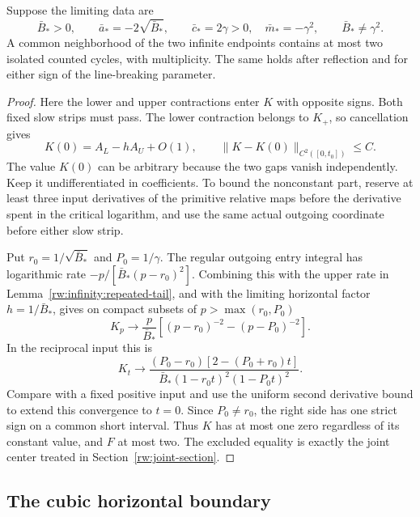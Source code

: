 \begin{proposition}\label{rw:infinity:opposing}
Suppose the limiting data are
\[
 \bar B_*>0,\qquad \bar a_*=-2\sqrt{\bar B_*},\qquad
 \bar c_*=2\gamma>0,\quad\bar m_*=-\gamma^2,\qquad
 \bar B_*\ne\gamma^2.
\]
A common neighborhood of the two infinite endpoints contains at most
two isolated counted cycles, with multiplicity. The same holds after
reflection and for either sign of the line-breaking parameter.
\end{proposition}
\begin{proof}
Here the lower and upper contractions enter $K$ with opposite signs.
Both fixed slow strips must pass. The lower contraction belongs to
$K_+$, so cancellation gives
\[
 K(0)=A_L-hA_U+O(1),\qquad
 \|K-K(0)\|_{C^2([0,t_0])}\le C.
\]
The value $K(0)$ can be arbitrary because the two gaps vanish
independently. Keep it undifferentiated in coefficients. To
bound the nonconstant part, reserve at least three input derivatives
of the primitive relative maps before the derivative spent in the
critical logarithm, and use the same actual outgoing coordinate
before either slow strip.

Put $r_0=1/\sqrt{\bar B_*}$ and $P_0=1/\gamma$.
The regular outgoing entry integral has logarithmic rate
$-p/[\bar B_*(p-r_0)^2]$. Combining this with the upper rate in
Lemma~\ref{rw:infinity:repeated-tail}, and with the limiting horizontal
factor $h=1/\bar B_*$, gives on compact subsets of
$p>\max(r_0,P_0)$
\[
 K_p\longrightarrow\frac p{\bar B_*}
      [(p-r_0)^{-2}-(p-P_0)^{-2}].
\]
In the reciprocal input this is
\begin{equation}\label{rw:infinity:opposing-slope}
 K_t\longrightarrow
 \frac{(P_0-r_0)[2-(P_0+r_0)t]}
 {\bar B_*(1-r_0t)^2(1-P_0t)^2}.
\end{equation}
Compare with a fixed positive input and use the uniform second
derivative bound to extend this convergence to $t=0$. Since
$P_0\ne r_0$, the right side has one strict sign on a common short interval. Thus $K$
has at most one zero regardless of its constant value, and $F$ at
most two. The excluded equality is exactly the joint center treated
in Section~\ref{rw:joint-section}.
\end{proof}

\subsection{The cubic horizontal boundary}

